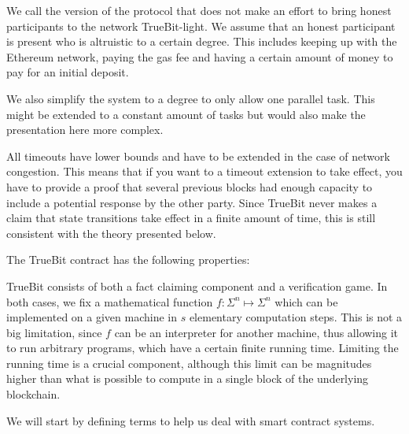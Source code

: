 \documentclass[11pt,letterpaper]{article}
\begin{document}
We call the version of the protocol that does not make an effort to bring honest participants to the network TrueBit-light.
We assume that an honest participant is present who is altruistic to a certain degree. This includes keeping up
with the Ethereum network, paying the gas fee and having a certain amount of money to pay for an initial deposit.

We also simplify the system to a degree to only allow one parallel task. This might be extended to a constant amount
of tasks but would also make the presentation here more complex.

All timeouts have lower bounds and have to be extended in the case of network congestion. This means that if you want
to a timeout extension to take effect, you have to provide a proof that several previous blocks had enough capacity to
include a potential response by the other party. Since TrueBit never makes a claim that state transitions take effect
in a finite amount of time, this is still consistent with the theory presented below.

The TrueBit contract has the following properties:

TrueBit consists of both a fact claiming component and a verification game. In both cases, we fix a mathematical function
$f \colon \Sigma^n \mapsto \Sigma^n$ which can be implemented on a given machine in $s$ elementary computation steps.
This is not a big limitation, since $f$ can be an interpreter for another machine, thus allowing it to run arbitrary programs,
which have a certain finite running time. Limiting the running time is a crucial component, although this limit can be
magnitudes higher than what is possible to compute in a single block of the underlying blockchain.

We will start by defining terms to help us deal with smart contract systems.
\end{document}
